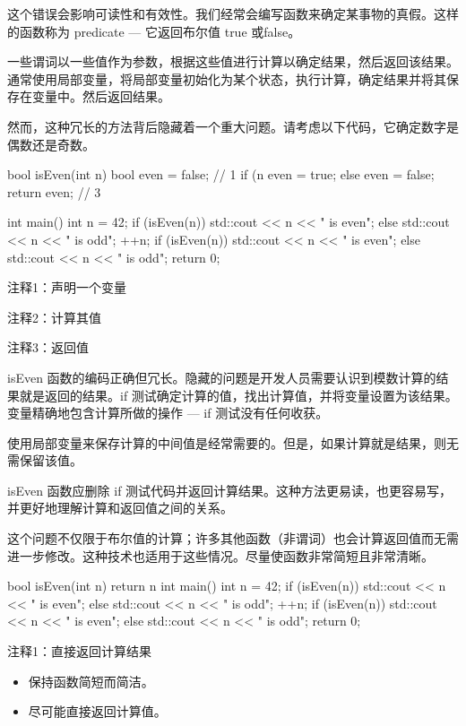 这个错误会影响可读性和有效性。我们经常会编写函数来确定某事物的真假。这样的函数称为 predicate — 它返回布尔值 true 或false。


一些谓词以一些值作为参数，根据这些值进行计算以确定结果，然后返回该结果。通常使用局部变量，将局部变量初始化为某个状态，执行计算，确定结果并将其保存在变量中。然后返回结果。

然而，这种冗长的方法背后隐藏着一个重大问题。请考虑以下代码，它确定数字是偶数还是奇数。


\begin{cpp}
bool isEven(int n) {
  bool even = false; // 1
  if (n %
    even = true;
  else
    even = false;
  return even; // 3
}

int main() {
  int n = 42;
  if (isEven(n))
    std::cout << n << " is even\n";
  else
    std::cout << n << " is odd\n";
  ++n;
  if (isEven(n))
    std::cout << n << " is even\n";
  else
    std::cout << n << " is odd\n";
  return 0;
}
\end{cpp}

{\footnotesize
注释1：声明一个变量

注释2：计算其值

注释3：返回值
}

isEven 函数的编码正确但冗长。隐藏的问题是开发人员需要认识到模数计算的结果就是返回的结果。if 测试确定计算的值，找出计算值，并将变量设置为该结果。变量精确地包含计算所做的操作 — if 测试没有任何收获。


使用局部变量来保存计算的中间值是经常需要的。但是，如果计算就是结果，则无需保留该值。


isEven 函数应删除 if 测试代码并返回计算结果。这种方法更易读，也更容易写，并更好地理解计算和返回值之间的关系。

这个问题不仅限于布尔值的计算；许多其他函数（非谓词）也会计算返回值而无需进一步修改。这种技术也适用于这些情况。尽量使函数非常简短且非常清晰。


\begin{cpp}
bool isEven(int n) {
  return n %
}
int main() {
  int n = 42;
  if (isEven(n))
    std::cout << n << " is even\n";
  else
    std::cout << n << " is odd\n";
  ++n;
  if (isEven(n))
    std::cout << n << " is even\n";
  else
    std::cout << n << " is odd\n";
  return 0;
}
\end{cpp}

{\footnotesize
注释1：直接返回计算结果
}


\begin{itemize}
\item
保持函数简短而简洁。

\item
尽可能直接返回计算值。
\end{itemize}







